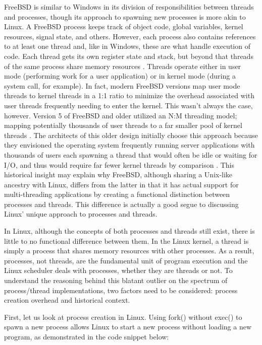 \documentclass[onecolumn, draftclsnofoot,10pt, compsoc]{IEEEtran}
\begin{document}
FreeBSD is similar to Windows in its division of responsibilities between threads and processes, though its approach to spawning new processes is more akin to Linux. A FreeBSD process keeps track of object code, global variables, kernel resources, signal state, and others. However, each process also contains references to at least one thread and, like in Windows, these are what handle execution of code. Each thread gets its own register state and stack, but beyond that threads of the same process share memory resources \cite{FreeBSD}. Threads operate either in user mode (performing work for a user application) or in kernel mode (during a system call, for example). In fact, modern FreeBSD versions map user mode threads to kernel threads in a 1:1 ratio to minimize the overhead associated with user threads frequently needing to enter the kernel. This wasn't always the case, however. Version 5 of FreeBSD and older utilized an N:M threading model; mapping potentially thousands of user threads to a far smaller pool of kernel threads \cite{FreeBSD}. The architects of this older design initially choose this approach because they envisioned the operating system frequently running server applications with thousands of users each spawning a thread that would often be idle or waiting for I/O, and thus would require far fewer kernel threads by comparison \cite{FreeBSD}. This historical insight may explain why FreeBSD, although sharing a Unix-like ancestry with Linux, differs from the latter in that it has actual support for multi-threading applications by creating a functional distinction between processes and threads. This difference is actually a good segue to discussing Linux' unique approach to processes and threads.

In Linux, although the concepts of both processes and threads still exist, there is little to no functional difference between them. In the Linux kernel, a thread is simply a process that shares memory resources with other processes. As a result, processes, not threads, are the fundamental unit of program execution and the Linux scheduler deals with processes, whether they are threads or not. To understand the reasoning behind this blatant outlier on the spectrum of process/thread implementations, two factors need to be considered: process creation overhead and historical context. 

First, let us look at process creation in Linux. Using fork() without exec() to spawn a new process allows Linux to start a new process without loading a new program, as demonstrated in the code snippet below:

\end{document}
